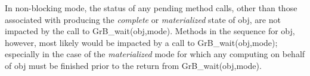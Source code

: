 In non-blocking mode, the status of any pending method calls, other than those associated with producing the
\emph{complete} or \emph{materialized} state of {\sf obj}, are not impacted by the call to {\sf GrB\_wait(obj,mode)}.
Methods in the sequence for {\sf obj}, however, most likely would be impacted by a call to
{\sf GrB\_wait(obj,mode)}; especially in the case of the \emph{materialized} mode for which any computing 
on behalf of {\sf obj} must be finished prior to the return from {\sf GrB\_wait(obj,mode)}.  



%
%
%
%
%
%
%
%

